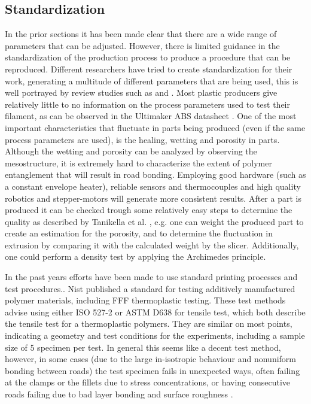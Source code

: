 \subsection{Standardization}
    \label{Standarization}
In the prior sections it has been made clear that there are a wide range of parameters that can be adjusted. However, there is limited guidance in the standardization of the production process to produce a procedure that can be reproduced. Different researchers have tried to create standardization for their work, generating a multitude of different parameters that are being used, this is well portrayed by review studies such as \cite{Peterson2019ReviewPerspective} and \cite{Popescu2018FDMReview}.  Most plastic producers give relatively little to no information on the process parameters used to test their filament, as can be observed in the Ultimaker ABS datasheet \cite{Ultimaker2018TechnicalABS}. One of the most important characteristics that fluctuate in parts being produced (even if the same process parameters are used), is the healing, wetting and porosity in parts. Although the wetting and porosity can be analyzed by observing the mesostructure, it is extremely hard to characterize the extent of polymer entanglement that will result in road bonding. Employing good hardware (such as a constant envelope heater), reliable sensors and thermocouples and high quality robotics and stepper-motors will generate more consistent results. After a part is produced it can be checked trough some relatively easy steps to determine the quality as described by Tanikella et al. \cite{Tanikella2017TensilePrinting}, e.g. one can weight the produced part to create an estimation for the porosity, and to determine the fluctuation in extrusion by comparing it with the calculated weight by the slicer. Additionally, one could perform a density test by applying the Archimedes principle.

In the past years efforts have been made to use standard printing processes and test procedures.. Nist \cite{Forster2015NISTApplicability} published a standard for testing additively manufactured polymer materials, including FFF thermoplastic testing. These test methods advise using either ISO 527-2 \cite{Afd2016NEN-EN-ISO527-2} or ASTM D638 \cite{Materials2015ASTMD638-14} for tensile test, which both describe the tensile test for a thermoplastic polymers. They are similar on most points, indicating a geometry and test conditions for the experiments, including a sample size of 5 specimen per test. In general this seems like a decent test method, however, in some cases (due to the large in-isotropic behaviour and nonuniform bonding between roads) the test specimen fails in unexpected ways, often failing at the clamps or the fillets due to stress concentrations\cite{Alaimo2017InfluenceParts}, or having consecutive roads failing due to bad layer bonding and surface roughness \cite{Ahn2002AnisotropicABS} \cite{Bertoldi1998MechanicalDeposition}. 

